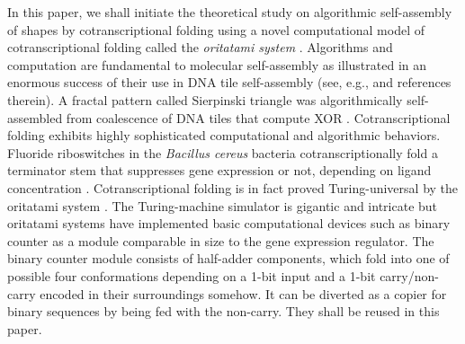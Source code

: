 In this paper, we shall initiate the theoretical study on algorithmic self-assembly of shapes by cotranscriptional folding using a novel computational model of cotranscriptional folding called the \textit{oritatami system} \cite{GeMeScSe2016}.
Algorithms and computation are fundamental to molecular self-assembly as illustrated in an enormous success of their use in DNA tile self-assembly (see, e.g., \cite{Doty2012,Patitz2016,WinfreePhD} and references therein). 
A fractal pattern called Sierpinski triangle was algorithmically self-assembled from coalescence of DNA tiles that compute XOR \cite{RothemundPapadakisWinfree2004}. 
Cotranscriptional folding exhibits highly sophisticated computational and algorithmic behaviors. 
Fluoride riboswitches in the \textit{Bacillus cereus} bacteria cotranscriptionally fold a terminator stem that suppresses gene expression or not, depending on ligand concentration \cite{WaStYuLiLu2016}. 
Cotranscriptional folding is in fact proved Turing-universal by the oritatami system \cite{GeMeScSe2015}. 
The Turing-machine simulator is gigantic and intricate but oritatami systems have implemented basic computational devices such as binary counter \cite{GeMeScSe2016} as a module comparable in size to the gene expression regulator. 
The binary counter module consists of half-adder components, which fold into one of possible four conformations depending on a 1-bit input and a 1-bit carry/non-carry encoded in their surroundings somehow. 
It can be diverted as a copier for binary sequences by being fed with the non-carry. 
They shall be reused in this paper. 

